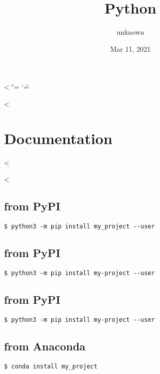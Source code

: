 \documentclass[letterpaper,10pt,english]{sphinxmanual}
\title{Python}
\date{Mar 11, 2021}
\author{unknown}
\makeatletter
\newcommand{\thesummary}{This is an awesome tool! 🚀 \textasciitilde\space intersphinx\_mapping \#  100\% ‘Quotes’}
\renewcommand{\py@release}{
	\releasename\space\version
	\par
	\vspace{25pt}
	\textup{\thesummary}
}
\renewcommand{\releasename}{}
\makeatother
\begin{document}
<%
  \ifnum\catcode`\=\string=\active\shorthandoff{=}\fi
  \ifnum\catcode`\"=\active{}\fi
\fi

<%
\sphinxmaketitle
\makeatletter\renewcommand{\py@release}{\releasename\space\version}\makeatother
\pagestyle{plain}
\sphinxtableofcontents
\pagestyle{normal}
\label{\detokenize{index::doc}}
\part{Documentation}

<%
\sphinxstepscope

<%


\chapter{from PyPI}
\label{\detokenize{installation:installation-0-from_PyPI}}\label{\detokenize{installation:installation-0}}
\begin{Verbatim}[commandchars=\\\{\}]
$ python3 -m pip install my_project --user
\end{Verbatim}


\chapter{from PyPI}
\label{\detokenize{installation:installation-1-from_PyPI}}\label{\detokenize{installation:installation-1}}
\begin{Verbatim}[commandchars=\\\{\}]
$ python3 -m pip install my-project --user
\end{Verbatim}


\chapter{from PyPI}
\label{\detokenize{installation:installation-2-from_PyPI}}\label{\detokenize{installation:installation-2}}
\begin{Verbatim}[commandchars=\\\{\}]
$ python3 -m pip install my-project --user
\end{Verbatim}


\chapter{from Anaconda}
\label{\detokenize{installation:installation-3-from_Anaconda}}\label{\detokenize{installation:installation-3}}
\begin{Verbatim}[commandchars=\\\{\}]
$ conda install my_project
\end{Verbatim}
\end{document}
